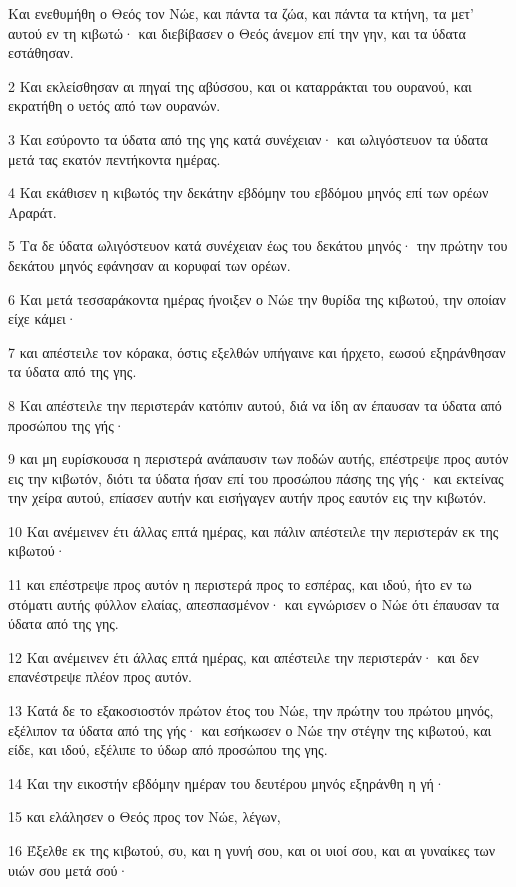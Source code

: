 \par Και ενεθυμήθη ο Θεός τον Νώε, και πάντα τα ζώα, και πάντα τα κτήνη, τα μετ' αυτού εν τη κιβωτώ· και διεβίβασεν ο Θεός άνεμον επί την γην, και τα ύδατα εστάθησαν.
\par 2 Και εκλείσθησαν αι πηγαί της αβύσσου, και οι καταρράκται του ουρανού, και εκρατήθη ο υετός από των ουρανών.
\par 3 Και εσύροντο τα ύδατα από της γης κατά συνέχειαν· και ωλιγόστευον τα ύδατα μετά τας εκατόν πεντήκοντα ημέρας.
\par 4 Και εκάθισεν η κιβωτός την δεκάτην εβδόμην του εβδόμου μηνός επί των ορέων Αραράτ.
\par 5 Τα δε ύδατα ωλιγόστευον κατά συνέχειαν έως του δεκάτου μηνός· την πρώτην του δεκάτου μηνός εφάνησαν αι κορυφαί των ορέων.
\par 6 Και μετά τεσσαράκοντα ημέρας ήνοιξεν ο Νώε την θυρίδα της κιβωτού, την οποίαν είχε κάμει·
\par 7 και απέστειλε τον κόρακα, όστις εξελθών υπήγαινε και ήρχετο, εωσού εξηράνθησαν τα ύδατα από της γης.
\par 8 Και απέστειλε την περιστεράν κατόπιν αυτού, διά να ίδη αν έπαυσαν τα ύδατα από προσώπου της γής·
\par 9 και μη ευρίσκουσα η περιστερά ανάπαυσιν των ποδών αυτής, επέστρεψε προς αυτόν εις την κιβωτόν, διότι τα ύδατα ήσαν επί του προσώπου πάσης της γής· και εκτείνας την χείρα αυτού, επίασεν αυτήν και εισήγαγεν αυτήν προς εαυτόν εις την κιβωτόν.
\par 10 Και ανέμεινεν έτι άλλας επτά ημέρας, και πάλιν απέστειλε την περιστεράν εκ της κιβωτού·
\par 11 και επέστρεψε προς αυτόν η περιστερά προς το εσπέρας, και ιδού, ήτο εν τω στόματι αυτής φύλλον ελαίας, απεσπασμένον· και εγνώρισεν ο Νώε ότι έπαυσαν τα ύδατα από της γης.
\par 12 Και ανέμεινεν έτι άλλας επτά ημέρας, και απέστειλε την περιστεράν· και δεν επανέστρεψε πλέον προς αυτόν.
\par 13 Κατά δε το εξακοσιοστόν πρώτον έτος του Νώε, την πρώτην του πρώτου μηνός, εξέλιπον τα ύδατα από της γής· και εσήκωσεν ο Νώε την στέγην της κιβωτού, και είδε, και ιδού, εξέλιπε το ύδωρ από προσώπου της γης.
\par 14 Και την εικοστήν εβδόμην ημέραν του δευτέρου μηνός εξηράνθη η γή·
\par 15 και ελάλησεν ο Θεός προς τον Νώε, λέγων,
\par 16 Έξελθε εκ της κιβωτού, συ, και η γυνή σου, και οι υιοί σου, και αι γυναίκες των υιών σου μετά σού·
